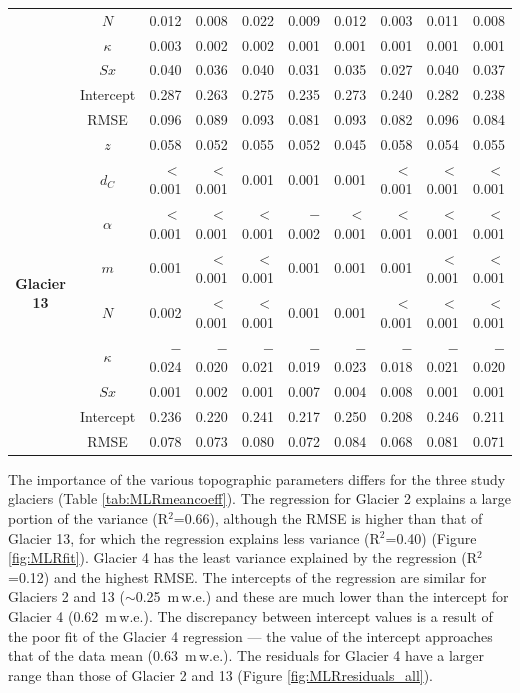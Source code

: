 \documentclass{sfuthesis}
\begin{document}
\begin{table}
\begin{tabular}{ccrrrrrrrr}
 & $N$ & 0.012 & 0.008 & 0.022 & 0.009 & 0.012 & 0.003 & 0.011 & 0.008 \\
 & $\kappa$ & 0.003 & 0.002 & 0.002 & 0.001 & 0.001 & 0.001 & 0.001 & 0.001 \\
 & $Sx$ & 0.040 & 0.036 & 0.040 & 0.031 & 0.035 & 0.027 & 0.040 & 0.037 \\
 & Intercept & 0.287 & 0.263 & 0.275 & 0.235 & 0.273 & 0.240 & 0.282 & 0.238 \\
 & RMSE & 0.096 & 0.089 & 0.093 & 0.081 & 0.093 & 0.082 & 0.096 & 0.084 \\ \hline
\multirow{9}{*}{\textbf{Glacier 13}} & $z$ & 0.058 & 0.052 & 0.055 & 0.052 & 0.045 & 0.058 & 0.054 & 0.055 \\
 & $d_C$ & $<$0.001 & $<$0.001 & 0.001 & 0.001 & 0.001 & $<$0.001 & $<$0.001 & $<$0.001 \\
 & $\alpha$ & $<$0.001 & $<$0.001 & $<$0.001 & $-$0.002 & $<$0.001 & $<$0.001 & $<$0.001 & $<$0.001 \\
 & $m$ & 0.001 & $<$0.001 & $<$0.001 & 0.001 & 0.001 & 0.001 & $<$0.001 & $<$0.001 \\
 & $N$ & 0.002 & $<$0.001 & $<$0.001 & 0.001 & 0.001 & $<$0.001 & $<$0.001 & $<$0.001 \\
 & $\kappa$ & $-$0.024 & $-$0.020 & $-$0.021 & $-$0.019 & $-$0.023 & $-$0.018 & $-$0.021 & $-$0.020 \\
 & $Sx$ & 0.001 & 0.002 & 0.001 & 0.007 & 0.004 & 0.008 & 0.001 & 0.001 \\
 & Intercept & 0.236 & 0.220 & 0.241 & 0.217 & 0.250 & 0.208 & 0.246 & 0.211 \\
 & RMSE & 0.078 & 0.073 & 0.080 & 0.072 & 0.084 & 0.068 & 0.081 & 0.071
\end{tabular}
\end{table}

The importance of the various topographic parameters differs for the three study glaciers (Table \ref{tab:MLRmeancoeff}). The regression for Glacier 2 explains a large portion of the variance (R$^2$=0.66), although the RMSE is higher than that of Glacier 13, for which the regression explains less variance (R$^2$=0.40) (Figure \ref{fig:MLRfit}). Glacier 4 has the least variance explained by the regression (R$^2$=0.12) and the highest RMSE. The intercepts of the regression are similar for Glaciers 2 and 13 ($\sim$0.25 \,m\,w.e.) and these are much lower than the intercept for Glacier 4 (0.62 \,m\,w.e.). The discrepancy between intercept values is a result of the poor fit of the Glacier 4 regression --- the value of the intercept approaches that of the data mean (0.63 \,m\,w.e.). The residuals for Glacier 4 have a larger range than those of Glacier 2 and 13 (Figure \ref{fig:MLRresiduals_all}).
\end{document}
